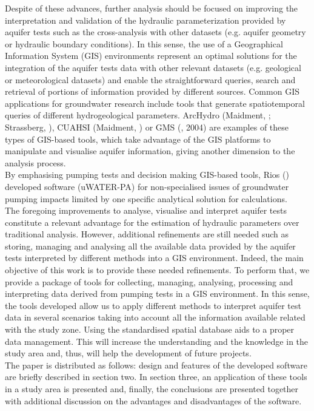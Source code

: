 Despite of these advances, further analysis should be focused on improving the interpretation and validation of the hydraulic parameterization provided by aquifer tests such as the cross-analysis with other datasets (e.g. aquifer geometry or hydraulic boundary conditions). In this sense, the use of a Geographical Information System (GIS) environments represent an optimal solutions for the integration of the aquifer tests data with other relevant datasets (e.g. geological or meteorological datasets) and enable the straightforward queries, search and retrieval of portions of information provided by different sources. Common GIS applications for groundwater research include tools that generate spatiotemporal queries of different hydrogeological parameters. ArcHydro (Maidment, \citeyear{Maidment2002ArcResources}; Strassberg, \citeyear{Strassberg2005ASystems}), CUAHSI (Maidment, \citeyear{Maidment2005CUAHSISymposium}) or GMS (\citeauthor{Jones2004GroundwaterSystem}, 2004) are examples of these types of GIS-based tools, which take advantage of the GIS platforms to manipulate and visualise aquifer information, giving another dimension to the analysis process.\\
By emphasising pumping tests and decision making GIS-based tools, Rios (\citeyear{Rios2011UWATER-PA:Assessment}) developed software (uWATER-PA) for non-specialised issues of groundwater pumping impacts limited by one specific analytical solution for calculations.\\
The foregoing improvements to analyse, visualise and interpret aquifer tests constitute a relevant advantage for the estimation of hydraulic parameters over traditional analysis. However, additional refinements are still needed such as storing, managing and analysing all the available data provided by the aquifer tests interpreted by different methods into a GIS environment. Indeed, the main objective of this work is to provide these needed refinements. To perform that, we provide a package of tools for collecting, managing, analysing, processing and interpreting data derived from pumping tests in a GIS environment. In this sense, the tools developed allow us to apply different methods to interpret aquifer test data in several scenarios taking into account all the information available related with the study zone. Using the standardised spatial database aids to a proper data management. This will increase the understanding and the knowledge in the study area and, thus, will help the development of future projects.\\
The paper is distributed as follows: design and features of the developed software are briefly described in section two. In section three, an application of these tools in a study area is presented and, finally, the conclusions are presented together with additional discussion on the advantages and disadvantages of the software.
